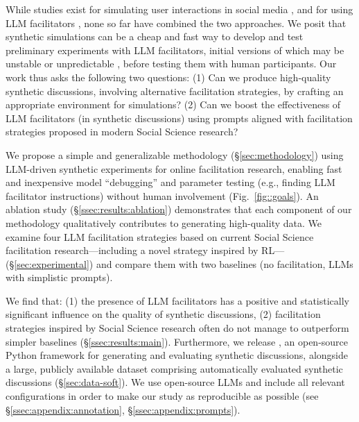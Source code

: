 While studies exist for simulating user interactions in social media \cite{park_simulacra, mou_2024, tornberg_2023, y_social, balog_2024}, and for using \ac{LLM} facilitators \cite{kim_et_al_chatbot, cho-etal-2024-language}, none so far have combined the two approaches. We posit that synthetic simulations can be a cheap and fast way to develop and test preliminary experiments with \ac{LLM} facilitators, initial versions of which may be unstable or unpredictable \cite{atil_2025, rossi_2024}, before testing them with human participants. Our work thus asks the following two questions: (1) Can we produce high-quality synthetic discussions, involving alternative facilitation strategies, by crafting an appropriate environment for simulations? (2) Can we boost the effectiveness of \ac{LLM} facilitators (in synthetic discussions) using prompts aligned with facilitation strategies proposed in modern Social Science research?

We propose a simple and generalizable methodology (\S\ref{sec:methodology}) using \ac{LLM}-driven synthetic experiments for online facilitation research, enabling fast and inexpensive model “debugging” and parameter testing (e.g., finding \ac{LLM} facilitator instructions) without human involvement (Fig.~\ref{fig::goals}). An ablation study (\S\ref{ssec:results:ablation}) demonstrates that each component of our methodology qualitatively contributes to generating high-quality data. We examine four \ac{LLM} facilitation strategies based on current Social Science facilitation research---including a novel strategy inspired by \ac{RL}---(\S\ref{sec:experimental}) and compare them with two baselines (no facilitation, \acp{LLM} with simplistic prompts).

We find that: (1) the presence of \ac{LLM} facilitators has a positive and statistically significant influence on the quality of synthetic discussions, (2) facilitation strategies inspired by Social Science research often do not manage to outperform simpler baselines (\S\ref{ssec:results:main}).
Furthermore, we release \syndisco, an open-source Python framework for generating and evaluating synthetic discussions, alongside \vmd\datasetlink a large, publicly available dataset comprising automatically evaluated synthetic discussions (\S\ref{sec:data-soft}). 
We use open-source \acp{LLM} and include all relevant configurations in order to make our study as reproducible as possible (see \S\ref{ssec:appendix:annotation}, \S\ref{ssec:appendix:prompts}).
